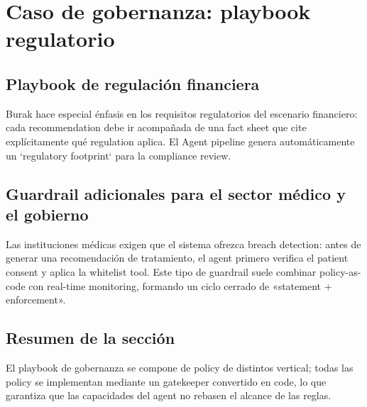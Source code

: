 \section{Caso de gobernanza: playbook regulatorio}

\subsection{Playbook de regulación financiera}

Burak hace especial énfasis en los requisitos regulatorios del escenario financiero: cada recommendation debe ir acompañada de una fact sheet que cite explícitamente qué regulation aplica. El Agent pipeline genera automáticamente un `regulatory footprint` para la compliance review.

\subsection{Guardrail adicionales para el sector médico y el gobierno}

Las instituciones médicas exigen que el sistema ofrezca breach detection: antes de generar una recomendación de tratamiento, el agent primero verifica el patient consent y aplica la whitelist tool. Este tipo de guardrail suele combinar policy-as-code con real-time monitoring, formando un ciclo cerrado de «statement + enforcement».

\subsection{Resumen de la sección}

El playbook de gobernanza se compone de policy de distintos vertical; todas las policy se implementan mediante un gatekeeper convertido en code, lo que garantiza que las capacidades del agent no rebasen el alcance de las reglas.
